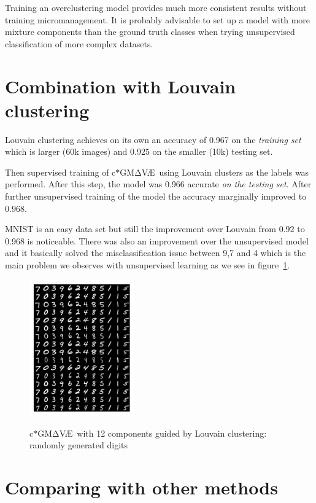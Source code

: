 \documentclass[11pt, a4paper]{report}
\theoremstyle{plain}
\theoremstyle{definition}
\theoremstyle{remark}
\newcommand{\gmvae}{c$\ast$GM$\mathrm{\Delta}$V\AE~}
\begin{document}
Training an overclustering model provides much more consistent results without
training micromanagement. It is probably advisable to set up a model with more
mixture components than the ground truth classes when trying unsupervised
classification of more complex datasets.

\section{Combination with Louvain clustering}

Louvain clustering achieves on its own an accuracy of 0.967 on the
\emph{training set} which is larger (60k images) and 0.925 on the smaller (10k) 
testing set.

Then supervised training of \gmvae using Louvain clusters as the
labels was performed.
After this step, the model was 0.966 accurate \emph{on the testing set}.
After further unsupervised training of the model the accuracy marginally
improved to 0.968.

MNIST is an easy data set but still the improvement over Louvain from 0.92 to 0.968 is
noticeable. There was also an improvement over the unsupervised model and it
basically solved the misclassification issue between 9,7 and 4 which is
the main problem we observes with unsupervised learning as we see in
figure~\ref{fig:mnist_us_louvain}.

\begin{figure}[h]
\centering
\includegraphics[width=0.4\textwidth]{images/gmmvae_mnist_us_louvain_samples1.png}
\label{fig:mnist_us_louvain_samples}
\caption{\gmvae with 12 components guided by Louvain clustering: randomly generated digits}
\label{fig:mnist_us_louvain}
\end{figure}

\section{Comparing with other methods}
\end{document}
